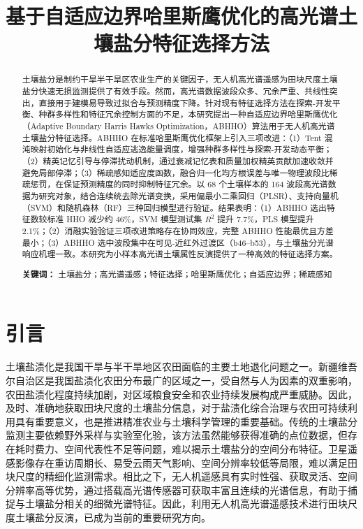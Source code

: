 \documentclass[12pt,a4paper]{article}
\title{\textbf{基于自适应边界哈里斯鹰优化的高光谱土壤盐分特征选择方法}}
\author{
}
\date{}
\begin{document}
\maketitle

\begin{abstract}
土壤盐分是制约干旱半干旱区农业生产的关键因子，无人机高光谱遥感为田块尺度土壤盐分快速无损监测提供了有效手段。然而，高光谱数据波段众多、冗余严重、共线性突出，直接用于建模易导致过拟合与预测精度下降。针对现有特征选择方法在探索-开发平衡、种群多样性和特征冗余控制方面的不足，本研究提出一种自适应边界哈里斯鹰优化（Adaptive Boundary Harris Hawks Optimization，ABHHO）算法用于无人机高光谱土壤盐分特征选择。ABHHO 在标准哈里斯鹰优化框架上引入三项改进：（1）Tent 混沌映射初始化与非线性自适应逃逸能量调度，增强种群多样性与探索-开发动态平衡；（2）精英记忆引导与停滞扰动机制，通过衰减记忆表和质量加权精英贡献加速收敛并避免局部停滞；（3）稀疏感知适应度函数，融合归一化均方根误差与唯一物理波段比稀疏惩罚，在保证预测精度的同时抑制特征冗余。以 68 个土壤样本的 164 波段高光谱数据为研究对象，结合连续统去除光谱变换，采用偏最小二乘回归（PLSR）、支持向量机（SVM）和随机森林（RF）三种回归模型进行验证。结果表明：（1）ABHHO 选出特征数较标准 HHO 减少约 46\%，SVM 模型测试集 $R^2$ 提升 7.7\%，PLS 模型提升 2.1\%；（2）消融实验验证三项改进策略存在协同效应，完整 ABHHO 性能最优且方差最小；（3）ABHHO 选中波段集中在可见-近红外过渡区（b46--b53），与土壤盐分光谱响应机理一致。本研究为小样本高光谱土壤属性反演提供了一种高效的特征选择方案。

\medskip
\noindent\textbf{关键词：} 土壤盐分；高光谱遥感；特征选择；哈里斯鹰优化；自适应边界；稀疏感知
\end{abstract}

\section{引言}
\label{sec:introduction}

土壤盐渍化是我国干旱与半干旱地区农田面临的主要土地退化问题之一。新疆维吾尔自治区是我国盐渍化农田分布最广的区域之一，受自然与人为因素的双重影响，农田盐渍化程度持续加剧，对区域粮食安全和农业持续发展构成严重威胁。因此，及时、准确地获取田块尺度的土壤盐分信息，对于盐渍化综合治理与农田可持续利用具有重要意义，也是推进精准农业与土壤科学管理的重要基础。传统的土壤盐分监测主要依赖野外采样与实验室化验，该方法虽然能够获得准确的点位数据，但存在耗时费力、空间代表性不足等问题，难以揭示土壤盐分的空间分布特征。卫星遥感影像存在重访周期长、易受云雨天气影响、空间分辨率较低等局限，难以满足田块尺度的精细化监测需求。相比之下，无人机遥感具有实时性强、获取灵活、空间分辨率高等优势，通过搭载高光谱传感器可获取丰富且连续的光谱信息，有助于捕捉与土壤盐分相关的细微光谱特征。因此，利用无人机高光谱遥感技术进行田块尺度土壤盐分反演，已成为当前的重要研究方向。
\end{document}
